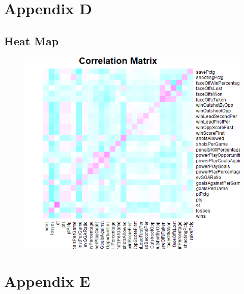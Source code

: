 \section*{Appendix D}
\newpage
\subsection*{Heat Map} 
\begin{figure}
	\centering
	\includegraphics[width=0.7\linewidth]{"Heat Map"}
	\caption{}
	\label{fig:heat-map}
\end{figure}
\section*{Appendix E}
